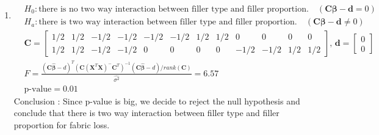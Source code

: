 \documentclass{article}
\begin{document}
\begin{enumerate}[leftmargin = 0 em, label = \arabic*., font = \bfseries]
\begin{enumerate}
		\item 
		\begin{align*}
		&H_0 : \textrm{there is no two way interaction between filler type and filler proportion.} \quad (\bm C \bm \beta - \bm d = 0)\\
		&H_a : \textrm{there is two way interaction between filler type and filler proportion.} \quad (\bm C \bm \beta -\bm d \neq 0)
		\end{align*}
		\begin{align*}
		& \bm C = \begin{bmatrix}
			1/2&1/2&-1/2&-1/2&-1/2&-1/2&1/2&1/2&0&0&0&0\\
			1/2&1/2&-1/2&-1/2&0&0&0&0&-1/2&-1/2&1/2&1/2
		\end{bmatrix},\, \bm d = \begin{bmatrix}
			0\\0
		\end{bmatrix}\\
		&  F = \frac{(\bm C \hat{\bm \beta} - d)^T (\bm C (\bm X^T \bm X)^-\bm C^T)^{-1} (\bm C \bm \hat{\bm\beta} - d)/rank(\bm C)}{\hat{\sigma^2}} = 6.57\\
		& \textrm{p-value} = 0.01
		\end{align*}
		Conclusion : Since p-value is big, we decide to reject the null hypothesis and conclude that there is two way interaction between filler type and filler proportion for fabric loss.

		
		


	\end{enumerate}
	
	


 	\end{enumerate}


	
	
	
	
\end{document}
